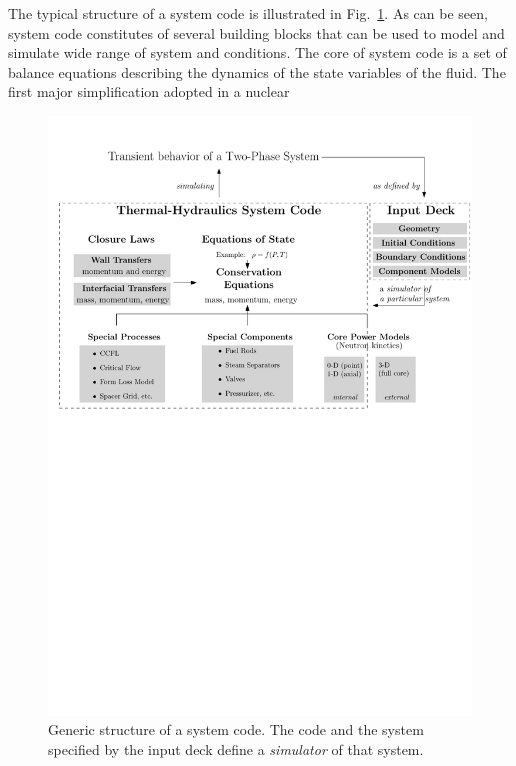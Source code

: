 The typical structure of a system code is illustrated in Fig.~\ref{fig:ch1_th_system_code}.
As can be seen, system code constitutes of several building blocks that can be used to model and simulate wide range of system and conditions.
The core of system code is a set of balance equations describing the dynamics of the state variables of the fluid.
The first major simplification adopted in a nuclear 
\begin{figure}[bth]	
	\centering
	\includegraphics[width=\textwidth]{../figures/chapter1/figures/th_system_code}
	\caption[Generic structure of a thermal-hydraulics (TH) system code]{Generic structure of a  system code. The code and the system specified by the input deck define a \emph{simulator} of that system.}
	\label{fig:ch1_th_system_code}
\end{figure}

